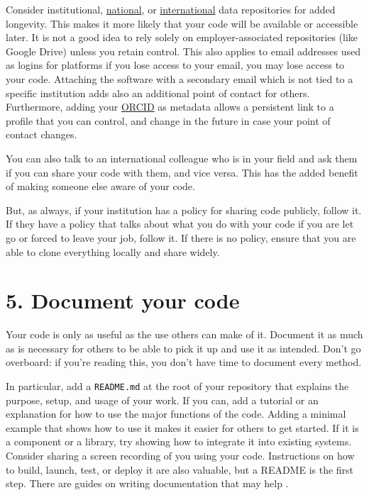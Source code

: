 \documentclass[10pt,letterpaper]{article}
\begin{document}
Consider institutional,
\href{https://amt.coretrustseal.org/certificates/}{national},
or \href{https://safeguar.de/}{international} data repositories for added longevity.
This makes it more likely that your code will be available or accessible later.
It is not a good idea to rely solely on employer-associated repositories (like Google Drive)
unless you retain control.
This also applies to email addresses used as logins for platforms
if you lose access to your email,
you may lose access to your code.
Attaching the software with a secondary email which is not tied to a specific institution
adds also an additional point of contact for others.
Furthermore,
adding your \href{https://orcid.org/}{ORCID} as metadata
allows a persistent link to a profile that you can control,
and change in the future in case your point of contact changes.

You can also talk to an international colleague who is in your field
and ask them if you can share your code with them, and vice versa.
This has the added benefit of making someone else aware of your code.

But,
as always,
if your institution has a policy for sharing code publicly,
follow it.
If they have a policy that talks about what you do with your code if you are let go or forced to leave your job,
follow it.
If there is no policy,
ensure that you are able to clone everything locally and share widely.

\section*{5. Document your code}

Your code is only as useful as the use others can make of it.
Document it as much as is necessary for others to be able to pick it up and use it as intended.
Don't go overboard:
if you're reading this,
you don't have time to document every method.

In particular,
add a \texttt{README.md} at the root of your repository
that explains the purpose, setup, and usage of your work.
If you can,
add a tutorial or an explanation for how to use the major functions of the code.
Adding a minimal example that shows how to use it makes it easier for others to get started.
If it is a component or a library,
try showing how to integrate it into existing systems.
Consider sharing a screen recording of you using your code.
Instructions on how to build,
launch, test, or deploy it are also valuable,
but a README is the first step.
There are guides on writing documentation that may help
\cite{Huybrechts2024,Littauer2025,Katz2025,Turing2025}.
\end{document}
